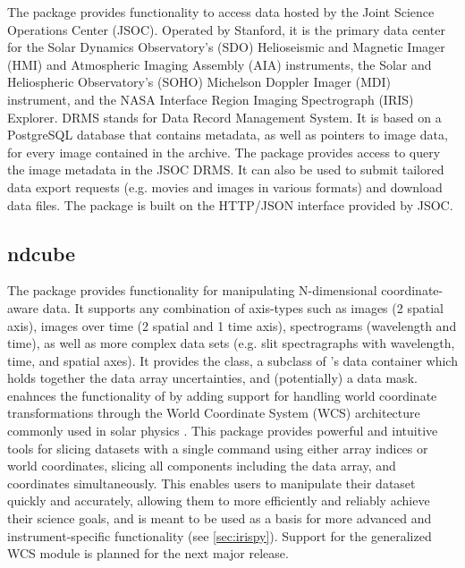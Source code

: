 The  package provides functionality to access data hosted by the Joint Science Operations Center (JSOC).
Operated by Stanford, it is the primary data center for the Solar Dynamics Observatory’s (SDO) Helioseismic and Magnetic Imager (HMI) and Atmospheric Imaging Assembly (AIA) instruments, the Solar and Heliospheric Observatory's (SOHO) Michelson Doppler Imager (MDI) instrument, and the NASA Interface Region Imaging Spectrograph (IRIS) Explorer.
DRMS stands for Data Record Management System. It is based on a PostgreSQL database that contains metadata, as well as pointers to image data, for every image contained in the archive.
The  package provides access to query the image metadata in the JSOC DRMS. It can also be used to submit tailored data export requests (e.g. movies and images in various formats) and download data files.
The package is built on the HTTP/JSON interface provided by JSOC.

\subsection{ndcube}
\label{sec:ndcube}

The  package provides functionality for manipulating N-dimensional coordinate-aware data.
It supports any combination of axis-types such as images (2 spatial axis), images over time (2 spatial and 1 time axis), spectrograms (wavelength and time), as well as more complex data sets (e.g. slit spectragraphs with wavelength, time, and spatial axes).
It provides the  class, a subclass of \astropy's  data container which holds together the data array uncertainties, and (potentially) a data mask.
 enahnces the functionality of  by adding support for handling world coordinate transformations through the World Coordinate System (WCS) architecture commonly used in solar physics \citep{2002A&A...395.1061G}.
This package provides powerful and intuitive tools for slicing datasets with a single command using either array indices or world coordinates, slicing all components including the data array, and coordinates simultaneously.
This enables users to manipulate their dataset quickly and accurately, allowing them to more efficiently and reliably achieve their science goals, and is meant to be used as a basis for more advanced and instrument-specific functionality (see \autoref{sec:irispy}).
Support for the generalized WCS module \citep{gwcs2018} is planned for the next major release.

